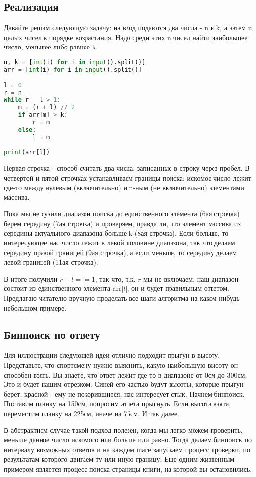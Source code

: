\documentclass[12pt]{article} %
\begin{document}
\subsection{Реализация}
Давайте решим следующую задачу: на вход подаются два числа - n и k, а затем n целых чисел в порядке возрастания. Надо среди этих n чисел найти наибольшее число, меньшее либо равное k. \newpage
\begin{lstlisting}[language=Python]
n, k = [int(i) for i in input().split()]
arr = [int(i) for i in input().split()]

l = 0
r = n
while r - l > 1:
	m = (r + l) // 2
	if arr[m] > k:
		r = m
	else:
		l = m

print(arr[l])
\end{lstlisting}
Первая строчка - способ считать два числа, записанные в строку через пробел. В четвертой и пятой строчках устанавливаем границы поиска: искомое число лежит где-то между нулевым (включительно) и n-ным (не включительно) элементами массива.

Пока мы не сузили диапазон поиска до единственного элемента (6ая строчка) берем середину (7ая строчка) и проверяем, правда ли, что элемент массива из середины актуального диапазона больше k (8ая строчка). Если больше, то интересующее нас число лежит в левой половине диапазона, так что делаем середину правой границей (9ая строчка), а если меньше, то середину делаем левой границей (11ая строчка).

В итоге получили $r - l == 1$, так что, т.к. $r$ мы не включаем, наш диапазон состоит из единственного элемента arr[$l$], он и будет правильным ответом. Предлагаю читателю вручную проделать все шаги алгоритма на каком-нибудь небольшом примере.

\subsection{Бинпоиск по ответу}
Для иллюстрации следующей идеи отлично подходит прыгун в высоту. Представьте, что спортсмену нужно выяснить, какую наибольшую высоту он способен взять. Вы знаете, что ответ лежит где-то в диапазоне от 0см до 300см. Это и будет нашим отрезком. Синей его частью будут высоты, которые прыгун берет, красной - ему не покорившиеся, нас интересует стык. Начнем бинпоиск. Поставим планку на 150см, попросим атлета прыгнуть. Если высота взята, переместим планку на 225см, иначе на 75см. И так далее.

В абстрактном случае такой подход полезен, когда мы легко можем проверить, меньше данное число искомого или больше или равно. Тогда делаем бинпоиск по интервалу возможных ответов и на каждом шаге запускаем процесс проверки, по результатам которого двигаем ту или иную границу. Еще одним жизненным примером является процесс поиска страницы книги, на которой вы остановились.
\end{document}
